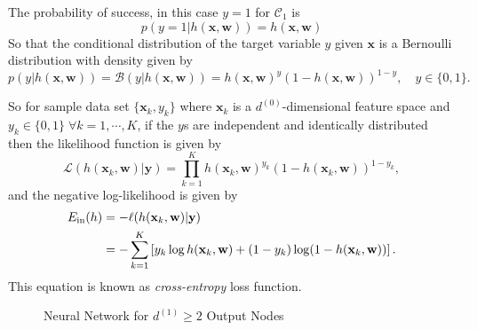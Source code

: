 The probability of success, in this case $y=1$ for $\mathcal{C}_1$ is 
$$
p(y=1|h(\mathbf{x},\mathbf{w}))=h(\mathbf{x},\mathbf{w})
$$
So that the conditional distribution of the target variable $y$ given $\mathbf{x}$ is a Bernoulli distribution with density given by
$$
p(y|h(\mathbf{x},\mathbf{w}))=\mathcal{B}(y|h(\mathbf{x},\mathbf{w}))=h(\mathbf{x},\mathbf{w})^{y}(1-h(\mathbf{x},\mathbf{w}))^{1-y},\quad y\in\{0,1\}.
$$

So for sample data set $\{\mathbf{x}_k,y_k\}$ where $\mathbf{x}_k$ is a $d^{(0)}$-dimensional feature space and $y_k\in\{0,1\}\;\forall k=1,\cdots, K$, if the $y$s are independent and identically distributed then the likelihood function is given by
$$
\mathcal{L}(h(\mathbf{x}_k,\mathbf{w})|\mathbf{y})=\prod_{k=1}^{K}h(\mathbf{x}_k,\mathbf{w})^{y_k}(1-h(\mathbf{x}_k,\mathbf{w}))^{1-y_k},
$$
and the negative log-likelihood is given by 
\begin{align}
E_{\mathrm{in}}(h)&=-\ell (h(\mathbf{x}_k,\mathbf{w})|\mathbf{y})\nonumber\\
&=-\sum_{k=1}^{K}\left[y_k\log h(\mathbf{x}_k,\mathbf{w})+(1-y_k)\log(1-h(\mathbf{x}_k,\mathbf{w}))\right].\label{eq:logitein}
\end{align}
This equation is known as \textit{cross-entropy} loss function. 
\begin{figure}[!t]
\centering
{}
\centering{}
\caption[Neural Network for $d^{(1)}\geq 2$ Output Nodes]{Neural Network for $d^{(1)}\geq 2$ Output Nodes}
\label{fig:kloginn}
\end{figure}
